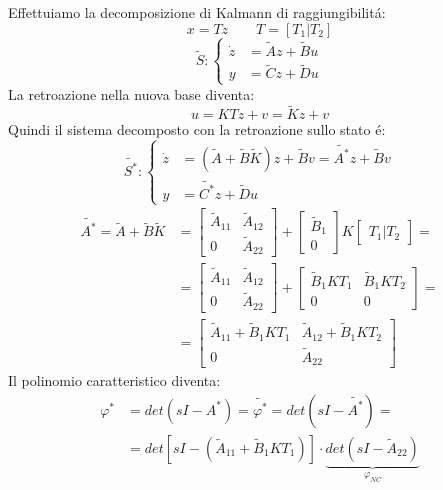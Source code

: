 \documentclass[../main.tex]{subfiles}
\begin{document}
		Effettuiamo la decomposizione di Kalmann di raggiungibilit\'a:
		\[ x = Tz \qquad T = [T_1 | T_2] \]
		\[
			\tilde S:
			\begin{cases}
				\dot z &= \tilde Az + \tilde Bu\\
				y &= \tilde Cz + \tilde Du
			\end{cases}
		\]
		La retroazione nella nuova base diventa:
		\[ u = KTz + v = \tilde Kz + v \]
		Quindi il sistema decomposto con la retroazione sullo stato \'e:
		\[
			\tilde{S^{*}}:
			\begin{cases}
				\dot z &= (\tilde A + \tilde B \tilde K)z + \tilde Bv = \tilde{A^{*}}z + \tilde{B} v\\
				y &= \tilde{C^{*}}z + \tilde Du
			\end{cases}
		\]
		\begin{align*}
			\tilde{A^{*}} = \tilde A + \tilde B \tilde K &=
			\begin{bmatrix}
				\tilde A_{11} & \tilde A_{12}\\
				0 & \tilde A_{22}
			\end{bmatrix} +
			\begin{bmatrix}
				\tilde B_{1}\\
				0
			\end{bmatrix} K
			\begin{bmatrix}
				T_1 | T_2
			\end{bmatrix}=
			\\
			&= \begin{bmatrix}
				\tilde A_{11} & \tilde A_{12}\\
				0 & \tilde A_{22}
			\end{bmatrix} +
			\begin{bmatrix}
				\tilde B_1 K T_1 & \tilde B_1 K T_2\\
				0 & 0
			\end{bmatrix}=
			\\
			&= \begin{bmatrix}
				\tilde A_{11} + \tilde B_1 K T_1 & \tilde A_{12} + \tilde B_1 K T_2\\
				0 & \tilde A_{22}
			\end{bmatrix}
		\end{align*}
		Il polinomio caratteristico diventa:
		\begin{align*}
			\varphi^{*} &= det(sI-A^{*}) = \tilde{\varphi^{*}} = det(sI-\tilde{A^{*}}) =\\
			&= det\left[ sI - (\tilde A_{11} + \tilde B_1 K T_1) \right] \cdot \underbrace{det(sI - \tilde A_{22})}_{\varphi_{NC}}
		\end{align*}
		
\end{document}
